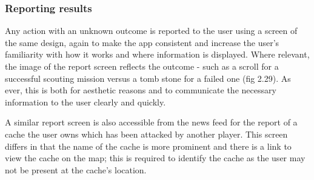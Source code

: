 \subsubsection{Reporting results}

Any action with an unknown outcome is reported to the user using a screen of the same design, again to make the app consistent and increase the user's familiarity with how it works and where information is displayed. Where relevant, the image of the report screen reflects the outcome - such as a scroll for a successful scouting mission versus a tomb stone for a failed one (fig 2.29). As ever, this is both for aesthetic reasons and to communicate the necessary information to the user clearly and quickly.

A similar report screen is also accessible from the news feed for the report of a cache the user owns which has been attacked by another player. This screen differs in that the name of the cache is more prominent and there is a link to view the cache on the map; this is required to identify the cache as the user may not be present at the cache's location.

